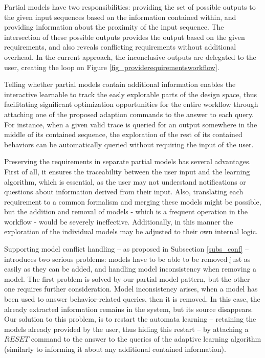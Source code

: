 Partial models have two responsibilities: providing the set of possible outputs to the given input sequences based on the information contained within, and providing information about the proximity of the input sequence. The intersection of these possible outputs provides the output based on the given requirements, and also reveals conflicting requirements without additional overhead. In the current approach, the inconclusive outputs are delegated to the user, creating the loop on Figure \ref{fig_providerequirementsworkflow}.

Telling whether partial models contain additional information enables the interactive learnable to track the easly explorable parts of the design space, thus facilitating significant optimization opportunities for the entire workflow through attaching one of the proposed adaption commands to the answer to each query. For instance, when a given valid trace is queried for an output somewhere in the middle of its contained sequence, the exploration of the rest of its contained behaviors can be automatically queried without requiring the input of the user. 

Preserving the requirements in separate partial models has several advantages. First of all, it ensures the traceability between the user input and the learning algorithm, which is essential, as the user may not understand notifications or questions about information derived from their input. Also, translating each requirement to a common formalism and merging these models might be possible, but the addition and removal of models - which is a frequent operation in the workflow - would be severely ineffective. Additionally, in this manner the exploration of the individual models may be adjusted to their own internal logic.

Supporting model conflict handling -- as proposed in Subsection \ref{subs_conf} -- introduces two serious problems: models have to be able to be removed just as easily as they can be added, and handling model inconsistency when removing a model. The first problem is solved by our partial model pattern, but the other one requires further consideration. Model inconsistency arises, when a model has been used to answer behavior-related queries, then it is removed. In this case, the already extracted information remains in the system, but its source disappears. Our solution to this problem, is to restart the automata learning -- retaining the models already provided by the user, thus hiding this restart -- by attaching a $RESET$ command to the answer to the queries of the adaptive learning algorithm (similarly to informing it about any additional contained information).

